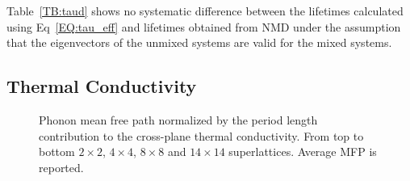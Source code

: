 \documentclass[aps,prb,preprint,preprintnumbers,amsmath,amssymb,floatfix,superscriptaddress]{revtex4}
\newcommand{\kv}{\mspace{-4.0mu}\left(\mspace{-8.0mu}
\begin{smallmatrix}&\pmb{\kappa} \\&\nu\end{smallmatrix}
\mspace{-3.0mu}\right)}
\begin{document}
Table~\ref{TB:taud} shows no systematic difference between the lifetimes calculated using Eq~\ref{EQ:tau_eff} and lifetimes obtained from NMD under the assumption that the eigenvectors of the unmixed systems are valid for the mixed systems.
\begin{comment}
\begin{table}
\begin{center}
\begin{tabular*}{\textwidth}{c@{\extracolsep{\fill}}ccccc}
\hline\hline\noalign{\smallskip}
&\multicolumn{3}{c}{$N\times N$ Superlattice} \\
\cline{2-5}\noalign{\smallskip}
\hspace{1cm} & $2\times2$ & $4\times4$ & $8\times8$ & $14\times14$  \\
\noalign{\smallskip}\hline\noalign{\smallskip}
RMSE $\sqrt{\frac{\sum_{\pmb{\kappa}\nu}(\tau_{eff}\kv-\tau_{mixed}\kv)^2}{n}}$ &0.65 & 1.21 & 2.09 & 5.42\\
Mean $\overline{\tau_{mixed}\kv}$ &1.37 & 1.93 & 2.74 & 3.40\\
Standard Deviation $\sigma[\tau_{mixed}\kv]$ &2.34 & 2.66 & 5.53 & 11.84\\
\noalign{\smallskip}\hline\hline
\end{tabular*}
\end{center}
\renewcommand{\table}{Table.}
\caption{The root-mean-square error between Tamura theory effective lifetimes and NMD mixed lifetimes. The mean and standard deviation of the NMD mixed lifetimes are provided for context. %
}
\label{TB:taud}
\end{table}
\end{comment}


\subsection{Thermal Conductivity}

\begin{figure}%
\begin{center}
\renewcommand{\figure}{Fig.}
\caption{Phonon mean free path normalized by the period length contribution to the cross-plane thermal conductivity. From top to bottom $2\times2$, $4\times4$, $8\times8$ and $14\times14$ superlattices. Average MFP is reported.}
\label{FIG:MFP_cp}
\end{center}
\end{figure}
\end{document}
